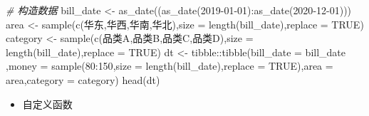 \documentclass[
]{book}
\newenvironment{Shaded}{\begin{snugshade}}{\end{snugshade}}
\newcommand{\AttributeTok}[1]{\textcolor[rgb]{0.77,0.63,0.00}{#1}}
\newcommand{\CommentTok}[1]{\textcolor[rgb]{0.56,0.35,0.01}{\textit{#1}}}
\newcommand{\ConstantTok}[1]{\textcolor[rgb]{0.00,0.00,0.00}{#1}}
\newcommand{\DecValTok}[1]{\textcolor[rgb]{0.00,0.00,0.81}{#1}}
\newcommand{\FunctionTok}[1]{\textcolor[rgb]{0.00,0.00,0.00}{#1}}
\newcommand{\NormalTok}[1]{#1}
\newcommand{\OtherTok}[1]{\textcolor[rgb]{0.56,0.35,0.01}{#1}}
\newcommand{\SpecialCharTok}[1]{\textcolor[rgb]{0.00,0.00,0.00}{#1}}
\newcommand{\StringTok}[1]{\textcolor[rgb]{0.31,0.60,0.02}{#1}}
\providecommand{\tightlist}{%
  \setlength{\itemsep}{0pt}\setlength{\parskip}{0pt}}
\begin{document}
\begin{Shaded}
\begin{Highlighting}[]
\CommentTok{\# 构造数据}
\NormalTok{bill\_date }\OtherTok{\textless{}{-}} \FunctionTok{as\_date}\NormalTok{((}\FunctionTok{as\_date}\NormalTok{(}\StringTok{\textquotesingle{}2019{-}01{-}01\textquotesingle{}}\NormalTok{)}\SpecialCharTok{:}\FunctionTok{as\_date}\NormalTok{(}\StringTok{\textquotesingle{}2020{-}12{-}01\textquotesingle{}}\NormalTok{)))}
\NormalTok{area }\OtherTok{\textless{}{-}}  \FunctionTok{sample}\NormalTok{(}\FunctionTok{c}\NormalTok{(}\StringTok{\textquotesingle{}华东\textquotesingle{}}\NormalTok{,}\StringTok{\textquotesingle{}华西\textquotesingle{}}\NormalTok{,}\StringTok{\textquotesingle{}华南\textquotesingle{}}\NormalTok{,}\StringTok{\textquotesingle{}华北\textquotesingle{}}\NormalTok{),}\AttributeTok{size =} \FunctionTok{length}\NormalTok{(bill\_date),}\AttributeTok{replace =} \ConstantTok{TRUE}\NormalTok{)}
\NormalTok{category }\OtherTok{\textless{}{-}} \FunctionTok{sample}\NormalTok{(}\FunctionTok{c}\NormalTok{(}\StringTok{\textquotesingle{}品类A\textquotesingle{}}\NormalTok{,}\StringTok{\textquotesingle{}品类B\textquotesingle{}}\NormalTok{,}\StringTok{\textquotesingle{}品类C\textquotesingle{}}\NormalTok{,}\StringTok{\textquotesingle{}品类D\textquotesingle{}}\NormalTok{),}\AttributeTok{size =} \FunctionTok{length}\NormalTok{(bill\_date),}\AttributeTok{replace =} \ConstantTok{TRUE}\NormalTok{)}
\NormalTok{dt }\OtherTok{\textless{}{-}}\NormalTok{ tibble}\SpecialCharTok{::}\FunctionTok{tibble}\NormalTok{(}\AttributeTok{bill\_date =}\NormalTok{ bill\_date ,}\AttributeTok{money =} \FunctionTok{sample}\NormalTok{(}\DecValTok{80}\SpecialCharTok{:}\DecValTok{150}\NormalTok{,}\AttributeTok{size =} \FunctionTok{length}\NormalTok{(bill\_date),}\AttributeTok{replace =} \ConstantTok{TRUE}\NormalTok{),}\AttributeTok{area =}\NormalTok{ area,}\AttributeTok{category =}\NormalTok{ category)}
\FunctionTok{head}\NormalTok{(dt)}
\end{Highlighting}
\end{Shaded}

\begin{itemize}
\tightlist
\item
  自定义函数
\end{itemize}
\end{document}
